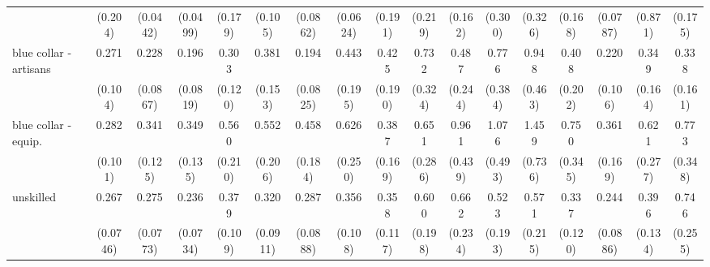 {\begin{tabular}{l*{16}{c}}
                    &     (0.204)         &    (0.0442)         &    (0.0499)         &     (0.179)         &     (0.105)         &    (0.0862)         &    (0.0624)         &     (0.191)         &     (0.219)         &     (0.162)         &     (0.300)         &     (0.326)         &     (0.168)         &    (0.0787)         &     (0.871)         &     (0.175)         \\
[1em]
blue collar - artisans&       0.271\sym{***}&       0.228\sym{***}&       0.196\sym{***}&       0.303\sym{**} &       0.381\sym{*}  &       0.194\sym{***}&       0.443         &       0.425         &       0.732         &       0.487         &       0.776         &       0.948         &       0.408         &       0.220\sym{**} &       0.349\sym{*}  &       0.338\sym{*}  \\
                    &     (0.104)         &    (0.0867)         &    (0.0819)         &     (0.120)         &     (0.153)         &    (0.0825)         &     (0.195)         &     (0.190)         &     (0.324)         &     (0.244)         &     (0.384)         &     (0.463)         &     (0.202)         &     (0.106)         &     (0.164)         &     (0.161)         \\
[1em]
blue collar - equip.&       0.282\sym{***}&       0.341\sym{**} &       0.349\sym{**} &       0.560         &       0.552         &       0.458         &       0.626         &       0.387\sym{*}  &       0.651         &       0.961         &       1.076         &       1.459         &       0.750         &       0.361\sym{*}  &       0.621         &       0.773         \\
                    &     (0.101)         &     (0.125)         &     (0.135)         &     (0.210)         &     (0.206)         &     (0.184)         &     (0.250)         &     (0.169)         &     (0.286)         &     (0.439)         &     (0.493)         &     (0.736)         &     (0.345)         &     (0.169)         &     (0.277)         &     (0.348)         \\
[1em]
unskilled           &       0.267\sym{***}&       0.275\sym{***}&       0.236\sym{***}&       0.379\sym{***}&       0.320\sym{***}&       0.287\sym{***}&       0.356\sym{***}&       0.358\sym{**} &       0.600         &       0.662         &       0.523         &       0.571         &       0.337\sym{**} &       0.244\sym{***}&       0.396\sym{**} &       0.746         \\
                    &    (0.0746)         &    (0.0773)         &    (0.0734)         &     (0.109)         &    (0.0911)         &    (0.0888)         &     (0.108)         &     (0.117)         &     (0.198)         &     (0.234)         &     (0.193)         &     (0.215)         &     (0.120)         &    (0.0886)         &     (0.134)         &     (0.255)         \\

\end{tabular}}
